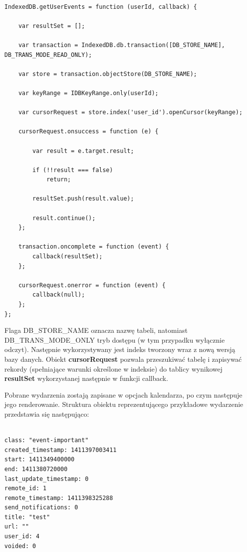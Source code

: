 \begin{lstlisting}[caption=Pobranie wydarzeń użytkownika., label=amb, captionpos=b]

IndexedDB.getUserEvents = function (userId, callback) {

    var resultSet = [];

    var transaction = IndexedDB.db.transaction([DB_STORE_NAME], DB_TRANS_MODE_READ_ONLY);

    var store = transaction.objectStore(DB_STORE_NAME);

    var keyRange = IDBKeyRange.only(userId);

    var cursorRequest = store.index('user_id').openCursor(keyRange);

    cursorRequest.onsuccess = function (e) {

        var result = e.target.result;

        if (!!result === false)
            return;

        resultSet.push(result.value);

        result.continue();
    };

    transaction.oncomplete = function (event) {
        callback(resultSet);
    };

    cursorRequest.onerror = function (event) {
        callback(null);
    };
};

\end{lstlisting}

Flaga DB\_STORE\_NAME oznacza nazwę tabeli, natomiast DB\_TRANS\_MODE\_ONLY tryb dostępu (w tym przypadku wyłącznie odczyt). Następnie wykorzystywany jest indeks tworzony wraz z nową wersją bazy danych. Obiekt \textbf{cursorRequest} pozwala przeszukiwać tabelę i zapisywać rekordy (spełniające warunki określone w indeksie) do tablicy wynikowej \textbf{resultSet} wykorzystanej następnie w funkcji callback.

Pobrane wydarzenia zostają zapisane w opcjach kalendarza, po czym następuje jego renderowanie. Struktura obiektu reprezentującego przykładowe wydarzenie przedstawia się następująco:

\begin{lstlisting}[caption=Struktura obiektu reprezentującego wydarzenie., label=amb, captionpos=b]

class: "event-important"
created_timestamp: 1411397003411
start: 1411349400000
end: 1411380720000
last_update_timestamp: 0
remote_id: 1
remote_timestamp: 1411398325288
send_notifications: 0
title: "test"
url: ""
user_id: 4
voided: 0

\end{lstlisting}


